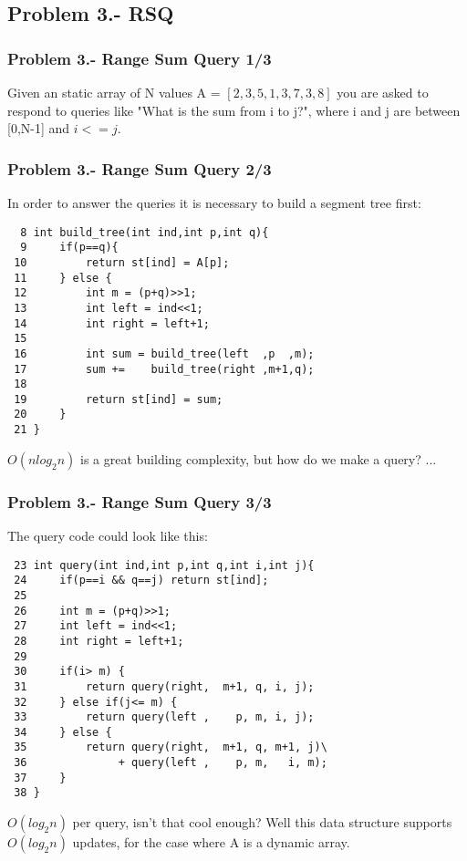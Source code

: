 \documentclass[article]{beamer}
\begin{document}
\subsection{Problem 3.- RSQ}

\begin{frame}[fragile]
	\frametitle{Problem 3.- Range Sum Query 1/3}
	{\footnotesize
		Given an static array of N values A = $[2,3,5,1,3,7,3,8]$ you are asked to
		respond to queries like "What is the sum from i to j?", where i and j
		are between [0,N-1] and $i<=j$. \newline
	}
\end{frame}


\begin{frame}[fragile]
	\frametitle{Problem 3.- Range Sum Query 2/3}
	In order to answer the queries it is necessary to build a segment tree first:	
	{\tiny
		\begin{lstlisting}
  8 int build_tree(int ind,int p,int q){
  9     if(p==q){
 10         return st[ind] = A[p];
 11     } else {
 12         int m = (p+q)>>1;
 13         int left = ind<<1;
 14         int right = left+1;
 15 
 16         int sum = build_tree(left  ,p  ,m);
 17         sum +=    build_tree(right ,m+1,q);
 18 
 19         return st[ind] = sum;
 20     }
 21 }	
		\end{lstlisting}
	}	
		$O(n log_{2} n)$ is a great building complexity, but how do we make a query? ...
\end{frame}

\begin{frame}[fragile]
	\frametitle{Problem 3.- Range Sum Query 3/3}
	The query code could look like this:
	{\tiny
		\begin{lstlisting}
 23 int query(int ind,int p,int q,int i,int j){
 24     if(p==i && q==j) return st[ind];
 25     
 26     int m = (p+q)>>1;
 27     int left = ind<<1;
 28     int right = left+1;
 29 
 30     if(i> m) {
 31         return query(right,  m+1, q, i, j);
 32     } else if(j<= m) {
 33         return query(left ,    p, m, i, j);
 34     } else {
 35         return query(right,  m+1, q, m+1, j)\
 36              + query(left ,    p, m,   i, m);
 37     }        
 38 }  
		\end{lstlisting}
	}
	$O(log_{2} n)$ per query, isn't that cool enough? Well this data structure supports $O(log_{2} n)$ updates, for the case where A is a dynamic array.
\end{frame}
	
\end{document}
